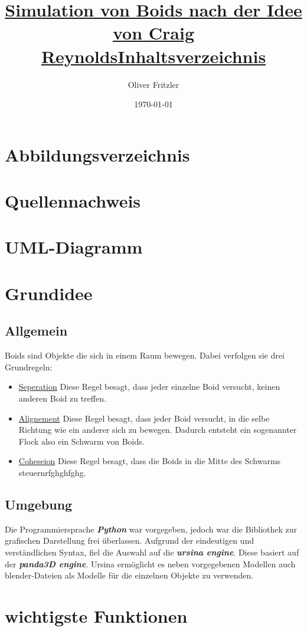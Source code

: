 \documentclass[a4paper, 12pt]{article}
\begin{document}
	\begin{titlepage}
		\title{\Large{\textbf{\underline{Simulation von Boids nach der Idee von Craig Reynolds}}}}
		\author{Oliver Fritzler}
		\date{\today}
		\maketitle
	\end{titlepage}
	\title{\Large{\textbf{\underline{Inhaltsverzeichnis}}}}
	\tableofcontents
	\newpage
	\section{Abbildungsverzeichnis}
	\newpage
	\section{Quellennachweis}
	\newpage
	\section{UML-Diagramm}
	\newpage
	\section{Grundidee}
	\subsection{Allgemein}
		Boids sind Objekte die sich in einem Raum bewegen. Dabei verfolgen sie drei Grundregeln:
		\begin{itemize}
			\item\underline{Seperation}\linebreak
			Diese Regel besagt, dass jeder einzelne Boid versucht, keinen anderen Boid zu treffen. 
			\item\underline{Alignement}\linebreak
			Diese Regel besagt, dass jeder Boid versucht, in die selbe Richtung wie ein anderer sich zu bewegen. Dadurch entsteht ein sogenannter Flock also ein Schwarm von Boids.
			\item\underline{Coheseion}\linebreak
			Diese Regel besagt, dass die Boids in die Mitte des Schwarms steuernrfghghfghg.
		\end{itemize}
	\subsection{Umgebung}
		Die Programmiersprache \emph{\textbf{Python}} war vorgegeben, jedoch war die Bibliothek zur grafischen Darstellung frei überlassen. Aufgrund der eindeutigen und verständlichen Syntax, fiel die Auswahl auf die \emph{\textbf{ursina engine}}. Diese basiert auf der \emph{\textbf{panda3D engine}}. Ursina ermöglicht es neben vorgegebenen Modellen auch blender-Dateien als Modelle für die einzelnen Objekte zu verwenden. 
	\newpage
	\section{wichtigste Funktionen}
	\newpage
\end{document}

